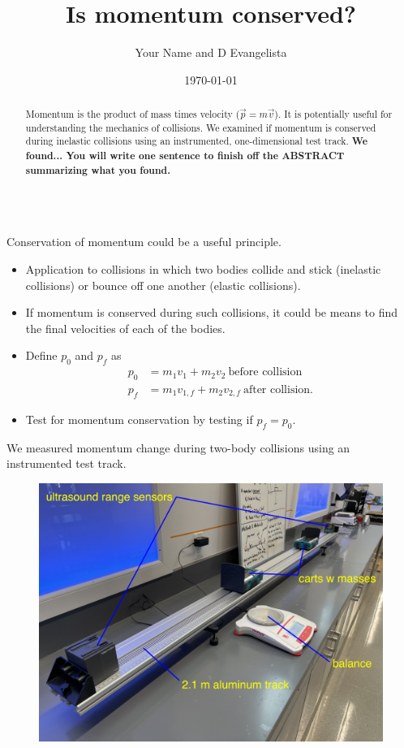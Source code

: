 \documentclass[pdf,serif]{beamer}
\title{Is momentum conserved?}
\author{Your Name and D Evangelista}
\institute{Manalapan High School}
\date{\today}
\begin{document}
\begin{frame}{}
\begin{columns}[T,totalwidth=\textwidth]
\begin{column}{14.33in}
\begin{minipage}[t][\textheight]{\linewidth}
\begin{abstract}
Momentum is the product of mass times velocity ($\vec{p}=m\vec{v}$). It is potentially useful for understanding the mechanics of collisions. We examined if momentum is conserved during inelastic collisions using an instrumented, one-dimensional test track. \textbf{We found... You will write one sentence to finish off the ABSTRACT summarizing what you found.}
\end{abstract}
\vfill
\begin{block}{Conservation of momentum could be a useful principle.}
\begin{itemize}
\item Application to collisions in which two bodies collide and stick (inelastic collisions) or bounce off one another (elastic collisions). 
\item If momentum is conserved during such collisions, it could be means to find the final velocities of each of the bodies. 
\item Define $p_0$ and $p_f$ as
\begin{align*}
p_0 &= m_1 v_1 + m_2 v_2\ \text{before collision} \\
p_f &= m_1 v_{1,f} + m_2 v_{2,f}\ \text{after collision}. 
\end{align*}
\item Test for momentum conservation by testing if $p_f=p_0$.
\end{itemize}
\end{block}
\vfill
\begin{block}{We measured momentum change during two-body collisions using an instrumented test track.}
\begin{figure}[h]
\begin{center}
\includegraphics[width=0.8\columnwidth]{fig1.png}

\end{center}
\end{figure}
\end{block}
\end{minipage}
\end{column}
\end{columns}
\end{frame}
\end{document}
